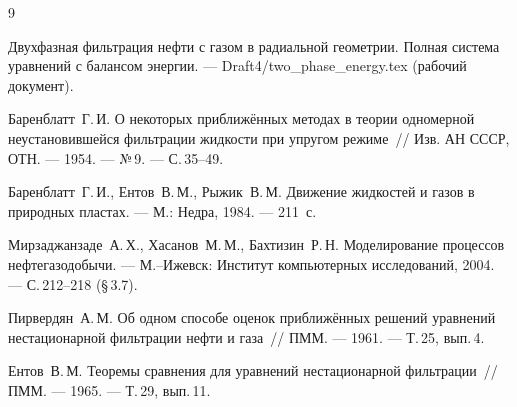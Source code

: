 \documentclass[12pt,a4paper]{article}
\begin{document}
\begin{thebibliography}{9}

  Двухфазная фильтрация нефти с газом в радиальной геометрии.
  Полная система уравнений с балансом энергии.
  --- Draft4/two\_phase\_energy.tex (рабочий документ).

  Баренблатт~Г.\,И. О некоторых приближённых методах в теории
  одномерной неустановившейся фильтрации жидкости при упругом
  режиме~// Изв. АН СССР, ОТН. --- 1954. --- №\,9. --- С.\,35--49.

  Баренблатт~Г.\,И., Ентов~В.\,М., Рыжик~В.\,М.
  Движение жидкостей и газов в природных пластах. ---
  М.: Недра, 1984. --- 211~с.

  Мирзаджанзаде~А.\,Х., Хасанов~М.\,М., Бахтизин~Р.\,Н.
  Моделирование процессов нефтегазодобычи. ---
  М.--Ижевск: Институт компьютерных исследований, 2004. ---
  С.\,212--218 (§\,3.7).

  Пирвердян~А.\,М. Об одном способе оценок приближённых решений
  уравнений нестационарной фильтрации нефти и газа~//
  ПММ. --- 1961. --- Т.\,25, вып.\,4.

  Ентов~В.\,М. Теоремы сравнения для уравнений нестационарной
  фильтрации~// ПММ. --- 1965. --- Т.\,29, вып.\,11.

\end{thebibliography}
\end{document}
